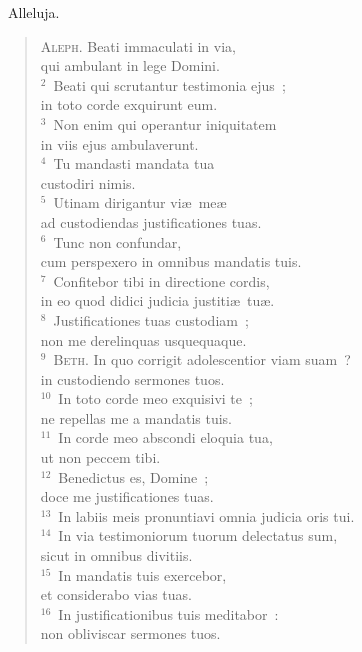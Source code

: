 ~\lettrine[lines=10,image=true,loversize=0.05,lraise=-0.03]{A}{}lleluja. \begin{flushleft}\begin{verse}\vspace{6pt}\textsc{Aleph.} Beati immaculati in via,\\ qui ambulant in lege Domini.\\
${}^{2}$~Beati qui scrutantur testimonia ejus~;\\ in toto corde exquirunt eum.\\
${}^{3}$~Non enim qui operantur iniquitatem\\ in viis ejus ambulaverunt.\\
${}^{4}$~Tu mandasti mandata tua\\ custodiri nimis.\\
${}^{5}$~Utinam dirigantur vi\ae\ me\ae \\ ad custodiendas justificationes tuas.\\
${}^{6}$~Tunc non confundar,\\ cum perspexero in omnibus mandatis tuis.\\
${}^{7}$~Confitebor tibi in directione cordis,\\ in eo quod didici judicia justiti\ae\ tu\ae .\\
${}^{8}$~Justificationes tuas custodiam~;\\ non me derelinquas usquequaque.\\
${}^{9}$~\textsc{Beth.} In quo corrigit adolescentior viam suam~?\\ in custodiendo sermones tuos.\\
${}^{10}$~In toto corde meo exquisivi te~;\\ ne repellas me a mandatis tuis.\\
${}^{11}$~In corde meo abscondi eloquia tua,\\ ut non peccem tibi.\\
${}^{12}$~Benedictus es, Domine~;\\ doce me justificationes tuas.\\
${}^{13}$~In labiis meis pronuntiavi omnia judicia oris tui.\\
${}^{14}$~In via testimoniorum tuorum delectatus sum,\\ sicut in omnibus divitiis.\\
${}^{15}$~In mandatis tuis exercebor,\\ et considerabo vias tuas.\\
${}^{16}$~In justificationibus tuis meditabor~:\\ non obliviscar sermones tuos.\\

\end{verse}
\end{flushleft}
